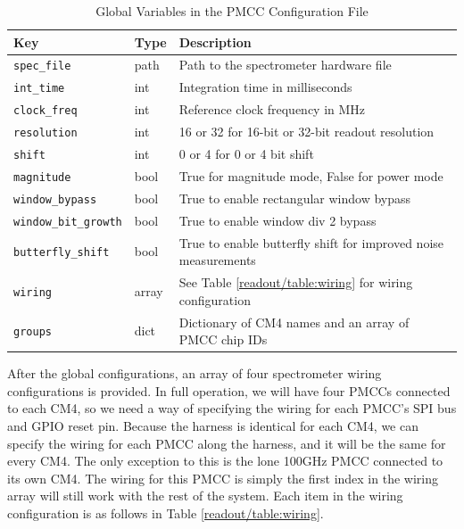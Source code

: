 \begin{table}
    \centering
    \begin{tabularx}{\textwidth}{l|l|X}
        \textbf{Key} & \textbf{Type} & \textbf{Description} \\ \hline    
        \texttt{spec\_file} & path & Path to the spectrometer hardware file \\
        \texttt{int\_time} & int & Integration time in milliseconds \\
        \texttt{clock\_freq} & int & Reference clock frequency in MHz \\
        \texttt{resolution} & int & 16 or 32 for 16-bit or 32-bit readout resolution \\
        \texttt{shift} & int & 0 or 4 for 0 or 4 bit shift \\
        \texttt{magnitude} & bool & True for magnitude mode, False for power mode \\
        \texttt{window\_bypass} & bool & True to enable rectangular window bypass \\
        \texttt{window\_bit\_growth} & bool & True to enable window div 2 bypass \\
        \texttt{butterfly\_shift} & bool & True to enable butterfly shift for improved noise measurements \\
        \texttt{wiring} & array & See Table \ref{readout/table:wiring} for wiring configuration \\
        \texttt{groups} & dict & Dictionary of CM4 names and an array of PMCC chip IDs  \\
    \end{tabularx}
    \caption{Global Variables in the PMCC Configuration File}
    \label{readout/table:pmcc_config}
\end{table}

After the global configurations, an array of four spectrometer wiring configurations is provided. 
In full operation, we will have four PMCCs connected to each CM4, so we need a way of specifying the wiring for each PMCC's SPI bus and GPIO reset pin.
Because the harness is identical for each CM4, we can specify the wiring for each PMCC along the harness, and it will be the same for every CM4. 
The only exception to this is the lone 100GHz PMCC connected to its own CM4. 
The wiring for this PMCC is simply the first index in the wiring array will still work with the rest of the system.
Each item in the wiring configuration is as follows in Table \ref{readout/table:wiring}.

